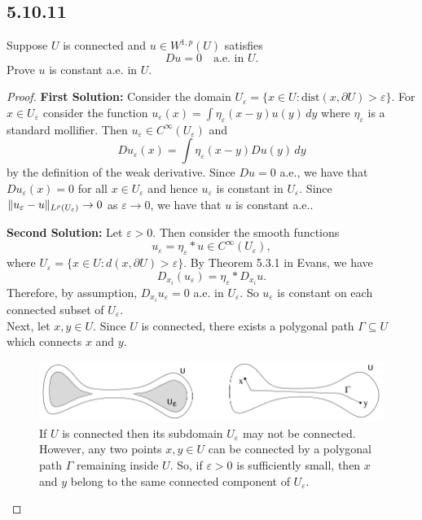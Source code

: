 \documentclass{article}
\DeclarePairedDelimiter{\norm}{\lVert}{\rVert}
\begin{document}
\begin{flushleft}
\subsection{\textbf{5.10.11}} Suppose $U$ is connected and $u\in W^{1,p}(U)$ satisfies
$$Du=0 \quad \text{a.e. in $U$}.$$
Prove $u$ is constant a.e. in $U$.

\begin{proof} \textbf{First Solution:}
Consider the domain $U_{\varepsilon}=\{x\in U: \text{dist}(x,\partial U) > \varepsilon\}$. For $x\in U_{\varepsilon}$ consider the function $u_\varepsilon(x) = \int \eta_\varepsilon(x-y)u(y)\,dy$ where $\eta_\varepsilon$ is a standard mollifier. Then $u_\varepsilon \in C^{\infty}(U_\varepsilon)$ and
$$Du_\varepsilon(x)=\int \eta_\varepsilon(x-y)Du(y)\,dy$$
by the definition of the weak derivative. Since $Du=0$ a.e., we have that $Du_\varepsilon(x)=0$ for all $x\in U_\varepsilon$ and hence $u_\varepsilon$ is constant in $U_\varepsilon$. Since $\norm{u_\varepsilon -u}_{L^p(U_\varepsilon)}\to 0$ as $\varepsilon \to 0$, we have that $u$ is constant a.e..

\textbf{Second Solution:}
Let $\varepsilon > 0$. Then consider the smooth functions
$$u_{\varepsilon}= \eta_{\varepsilon}\ast u \in C^{\infty}(U_{\varepsilon}),$$
where $U_{\varepsilon}=\{x\in U: d(x,\partial U) > \varepsilon\}$. By Theorem 5.3.1 in Evans, we have
$$D_{x_i}(u_{\varepsilon})=\eta_{\varepsilon}\ast D_{x_i}u.$$
Therefore, by assumption, $D_{x_i}u_{\varepsilon}=0$ a.e. in $U_{\varepsilon}$. So $u_{\varepsilon}$ is constant on each connected subset of $U_{\varepsilon}$.
\\
\bigskip
Next, let $x,y\in U$. Since $U$ is connected, there exists a polygonal path $\Gamma\subseteq U$ which connects $x$ and $y$. 

\begin{figure}[!ht]
\begin{center}
\includegraphics[scale=0.7]{Connected.png}
\caption{If $U$ is connected then its subdomain $U_{\varepsilon}$ may not be connected. However, any two points $x,y\in U$ can be connected by a polygonal path $\Gamma$ remaining inside $U$. So, if $\varepsilon >0$ is sufficiently small, then $x$ and $y$ belong to the same connected component of $U_{\varepsilon}$.}
\end{center}
\end{figure}


\end{proof}
\end{flushleft}
\end{document}
